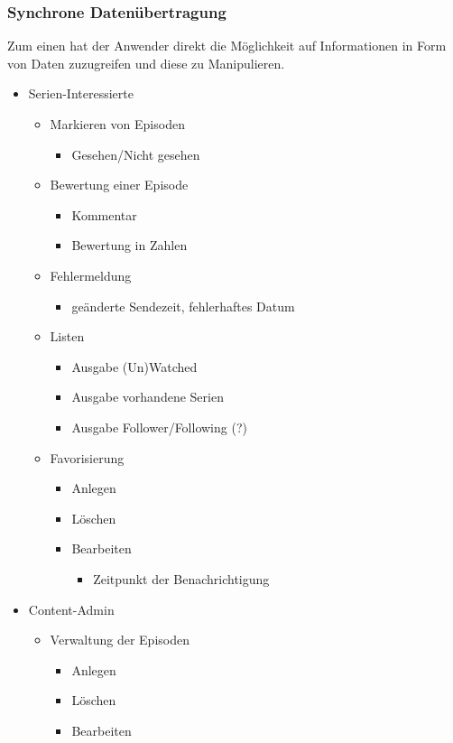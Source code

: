 \documentclass[a4paper]{article}
\begin{document}
\subsubsection{Synchrone Datenübertragung}

Zum einen hat der Anwender direkt die Möglichkeit auf Informationen in Form von Daten zuzugreifen und diese zu Manipulieren.

\begin{itemize}
\item
Serien-Interessierte
	\begin{itemize}
	\item
    Markieren von Episoden
    	\begin{itemize}
    	\item
     	Gesehen/Nicht gesehen
     	\end{itemize}
    \item
    Bewertung einer Episode
      	\begin{itemize}
      	\item
        Kommentar
        \item
        Bewertung in Zahlen
        \end{itemize}
     \item
     Fehlermeldung
     	\begin{itemize}
     	\item
        geänderte Sendezeit, fehlerhaftes Datum
        \end{itemize}
     \item
     Listen
     	\begin{itemize}
     	\item
    	Ausgabe (Un)Watched
    	\item
     	Ausgabe vorhandene Serien
     	\item
     	Ausgabe Follower/Following (?)
     	\end{itemize}
     \item
     Favorisierung
   	  	\begin{itemize}
   	  	\item
   	  	Anlegen
   	  	\item
   	  	Löschen
   	  	\item
   	  	Bearbeiten
   	  		\begin{itemize}
   	  		\item
   	  	    Zeitpunkt der Benachrichtigung
   	  	    \end{itemize}
		\end{itemize}
	\end{itemize}
	\item
	Content-Admin
		\begin{itemize}
		\item
		Verwaltung der Episoden
			\begin{itemize}
			\item
			Anlegen
			\item
			Löschen
			\item
			Bearbeiten
			\end{itemize}
		\end{itemize}
\end{itemize}
\end{document}
